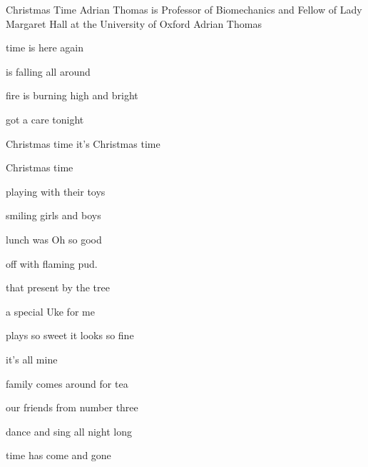 \begin{SBSong}{Christmas Time}
  {Adrian Thomas is Professor of Biomechanics and Fellow of Lady Margaret Hall at the University of Oxford}
  {Adrian Thomas}
  \begin{SBVerse}
     time is here again
    
     is falling all around
    
     fire is burning high and bright
    
      got a care tonight
  \end{SBVerse}
  \begin{SBChorus}
     Christmas time it's Christmas time
    
     Christmas time 
  \end{SBChorus}
  \begin{SBVerse}
     playing with their toys
    
     smiling girls and boys
    
     lunch was Oh so good

     off with flaming pud.
  \end{SBVerse}
  \begin{SBVerse}
     that present by the tree
    
     a special Uke for me

     plays so sweet it looks so fine

      it's all mine
  \end{SBVerse}
  \begin{SBVerse}
     family comes around for tea

     our friends from number three

     dance and sing all night long

     time has come and gone
  \end{SBVerse}
\end{SBSong}
